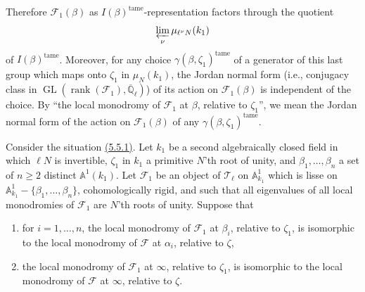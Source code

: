 Therefore \(\mathcal{F}_1(\beta)\) as \(I(\beta)^{\mathrm{tame}}\)-representation
factors through the quotient
\[
  \varprojlim_\nu\mu_{\ell^\nu N}(k_1)
\]
of \(I(\beta)^{\mathrm{tame}}\). Moreover, for any choice
\(\gamma(\beta,\zeta_1)^{\mathrm{tame}}\) of a generator of this last group
which maps onto \(\zeta_1\) in \(\mu_N(k_1)\), the Jordan normal form (i.e.,
conjugacy class in \(\operatorname{GL}(\operatorname{rank}(\mathcal{F}_1),
\overline{\mathbb{Q}}_\ell)\)) of its action on \(\mathcal{F}_1(\beta)\) is
independent of the choice. By ``the local monodromy of \(\mathcal{F}_1\) at
\(\beta\), relative to \(\zeta_1\)'', we mean the Jordan normal form of the
action on \(\mathcal{F}_1(\beta)\) of any
\(\gamma(\beta,\zeta_1)^{\mathrm{tame}}\).

Consider the situation \hyperref[par:5.5.1]{(5.5.1)}. Let \(k_1\) be a second
algebraically closed field in which \(\ell N\) is invertible, \(\zeta_1\) in
\(k_1\) a primitive \(N\)'th root of unity, and
\(\beta_1,\ldots,\beta_n\) a set of \(n\geq 2\) distinct
\(\mathbb{A}^1(k_1)\). Let \(\mathcal{F}_1\) be an object of
\(\mathcal{T}_\ell\) on \(\mathbb{A}^1_{k_1}\) which is lisse on
\(\mathbb{A}^1_{k_1}-\{\beta_1,\ldots,\beta_n\}\), cohomologically rigid, and
such that all eigenvalues of all local monodromies of \(\mathcal{F}_1\) are
\(N\)'th roots of unity. Suppose that
\begin{enumerate}[label=(\arabic*)]
\item for \(i=1,\ldots,n\), the local monodromy of \(\mathcal{F}_1\) at
\(\beta_i\), relative to \(\zeta_1\), is isomorphic to the local monodromy of
\(\mathcal{F}\) at \(\alpha_i\), relative to \(\zeta\),

\item the local monodromy of \(\mathcal{F}_1\) at \(\infty\), relative to
\(\zeta_1\), is isomorphic to the local monodromy of \(\mathcal{F}\) at
\(\infty\), relative to \(\zeta\).
\end{enumerate}

